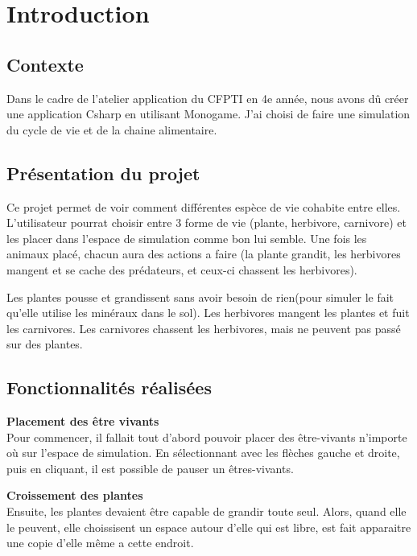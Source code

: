 \documentclass[10pt,a4paper]{article}
\begin{document}
	

	\tableofcontents

	\newpage
	\section{Introduction}
	
	\subsection{Contexte}
	Dans le cadre de l'atelier application du CFPTI en 4e année, nous avons dû créer une application Csharp en utilisant Monogame. J'ai choisi de faire une simulation du cycle de vie et de la chaine alimentaire.
	
	
	\subsection{Présentation du projet}	
	Ce projet permet de voir comment différentes espèce de vie cohabite entre elles. L'utilisateur pourrat choisir entre 3 forme de vie (plante, herbivore, carnivore) et les placer dans l'espace de simulation comme bon lui semble. Une fois les animaux placé, chacun aura des actions a faire (la plante grandit, les herbivores mangent et se cache des prédateurs, et ceux-ci chassent les herbivores).
	
	Les plantes pousse et grandissent sans avoir besoin de rien(pour simuler le fait qu'elle utilise les minéraux dans le sol). Les herbivores mangent les plantes et fuit les carnivores. Les carnivores chassent les herbivores, mais ne peuvent pas passé sur des plantes.
	
	\subsection{Fonctionnalités réalisées}
	
	\textbf{Placement des être vivants}\\
	Pour commencer, il fallait tout d'abord pouvoir placer des être-vivants n'importe où sur l'espace de simulation. En sélectionnant avec les flèches gauche et droite, puis en cliquant, il est possible de pauser un êtres-vivants.
	
	\textbf{Croissement des plantes}\\
	Ensuite, les plantes devaient être capable de grandir toute seul. Alors, quand elle le peuvent, elle choissisent un espace autour d'elle qui est libre, est fait apparaitre une copie d'elle même a cette endroit.
	
\end{document}
